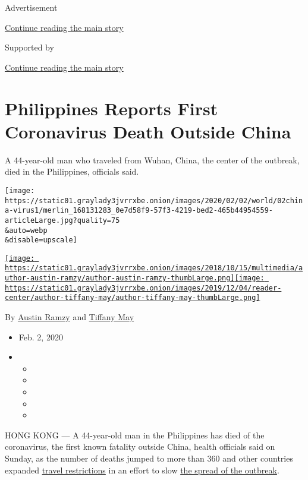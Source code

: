 Advertisement

\protect\hyperlink{after-top}{Continue reading the main story}

Supported by

\protect\hyperlink{after-sponsor}{Continue reading the main story}

\hypertarget{philippines-reports-first-coronavirus-death-outside-china}{%
\section{Philippines Reports First Coronavirus Death Outside
China}\label{philippines-reports-first-coronavirus-death-outside-china}}

A 44-year-old man who traveled from Wuhan, China, the center of the
outbreak, died in the Philippines, officials said.

\texttt{[image: https://static01.graylady3jvrrxbe.onion/images/2020/02/02/world/02china-virus1/merlin\_168131283\_0e7d58f9-57f3-4219-bed2-465b44954559-articleLarge.jpg?quality=75\\\&auto=webp\\\&disable=upscale]}

\href{https://www.nytimes3xbfgragh.onion/by/austin-ramzy}{\texttt{[image: https://static01.graylady3jvrrxbe.onion/images/2018/10/15/multimedia/author-austin-ramzy/author-austin-ramzy-thumbLarge.png]}}\href{https://www.nytimes3xbfgragh.onion/by/tiffany-may}{\texttt{[image: https://static01.graylady3jvrrxbe.onion/images/2019/12/04/reader-center/author-tiffany-may/author-tiffany-may-thumbLarge.png]}}

By \href{https://www.nytimes3xbfgragh.onion/by/austin-ramzy}{Austin
Ramzy} and
\href{https://www.nytimes3xbfgragh.onion/by/tiffany-may}{Tiffany May}

\begin{itemize}
\item
  Feb. 2, 2020
\item
  \begin{itemize}
  \item
  \item
  \item
  \item
  \item
  \end{itemize}
\end{itemize}

HONG KONG --- A 44-year-old man in the Philippines has died of the
coronavirus, the first known fatality outside China, health officials
said on Sunday, as the number of deaths jumped to more than 360 and
other countries expanded
\href{https://www.nytimes3xbfgragh.onion/2020/02/01/world/asia/china-coronavirus-us-australia.html}{travel
restrictions} in an effort to slow
\href{https://www.nytimes3xbfgragh.onion/interactive/2020/world/asia/china-coronavirus-contain.html}{the
spread of the outbreak}.

